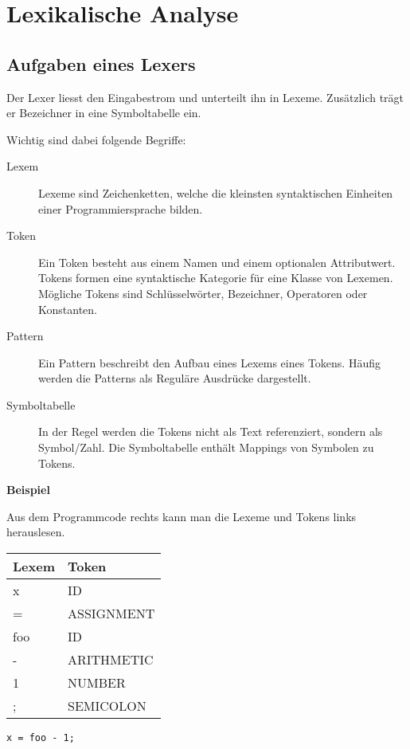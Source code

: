 \section{Lexikalische Analyse}


\subsection{Aufgaben eines Lexers}

Der Lexer liesst den Eingabestrom und unterteilt ihn in Lexeme. Zusätzlich trägt
er Bezeichner in eine Symboltabelle ein.

Wichtig sind dabei folgende Begriffe:

\begin{description}
	\item[Lexem] Lexeme sind Zeichenketten, welche die kleinsten syntaktischen
		Einheiten einer Programmiersprache bilden.
	\item[Token] Ein Token besteht aus einem Namen und einem optionalen
		Attributwert. Tokens formen eine syntaktische Kategorie für eine Klasse von
		Lexemen. Mögliche Tokens sind Schlüsselwörter, Bezeichner, Operatoren oder
		Konstanten.
	\item[Pattern] Ein Pattern beschreibt den Aufbau eines Lexems eines Tokens.
		Häufig werden die Patterns als Reguläre Ausdrücke dargestellt.
	\item[Symboltabelle] In der Regel werden die Tokens nicht als Text
		referenziert, sondern als Symbol/Zahl. Die Symboltabelle enthält Mappings
		von Symbolen zu Tokens.
\end{description}

\textbf{Beispiel}

Aus dem Programmcode rechts kann man die Lexeme und Tokens links
herauslesen.

\begin{minipage}{.4\linewidth}
	\begin{tabular}[h]{|l|l|}
		\hline
		\textbf{Lexem} & \textbf{Token} \\
		\hline
		x & ID \\
		= & ASSIGNMENT \\
		foo & ID \\
		- & ARITHMETIC \\
		1 & NUMBER \\
		; & SEMICOLON \\
		\hline
	\end{tabular}
\end{minipage}
\begin{minipage}{.6\linewidth}
	\large\texttt{x = foo - 1;}
\end{minipage}


